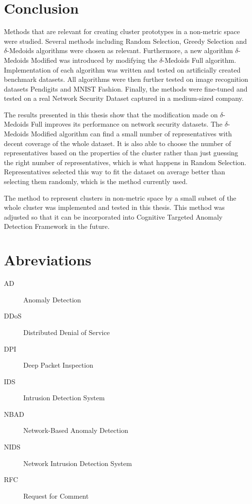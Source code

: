 \documentclass[thesis=B,english]{FITthesis}[2012/10/20]
\begin{document}


\chapter{Conclusion}

Methods that are relevant for creating cluster prototypes in a non-metric space were studied.
Several methods including Random Selection, Greedy Selection and $\delta$-Medoids algorithms were chosen as relevant.
Furthermore, a new algorithm $\delta$-Medoids Modified was introduced by modifying the $\delta$-Medoids Full algorithm.
Implementation of each algorithm was written and tested on artificially created benchmark datasets.
All algorithms were then further tested on image recognition datasets Pendigits and MNIST Fashion.
Finally, the methods were fine-tuned and tested on a real Network Security Dataset captured in a medium-sized company.

The results presented in this thesis show that the modification made on $\delta$-Medoids Full improves its performance on network security datasets.
The $\delta$-Medoids Modified algorithm can find a small number of representatives with decent coverage of the whole dataset.
It is also able to choose the number of representatives based on the properties of the cluster rather than just guessing the right number of representatives, which is what happens in Random Selection.
Representatives selected this way to fit the dataset on average better than selecting them randomly, which is the method currently used.

The method to represent clusters in non-metric space by a small subset of the whole cluster was implemented and tested in this thesis.
This method was adjusted so that it can be incorporated into Cognitive Targeted Anomaly Detection Framework in the future.




\appendix

\chapter{Abreviations}
\begin{description}
    \item[AD] Anomaly Detection
    \item[DDoS] Distributed Denial of Service
    \item[DPI] Deep Packet Inspection
    \item[IDS] Intrusion Detection System
	\item[NBAD] Network-Based Anomaly Detection
	\item[NIDS] Network Intrusion Detection System
    \item[RFC] Request for Comment
\end{description}
\end{document}
